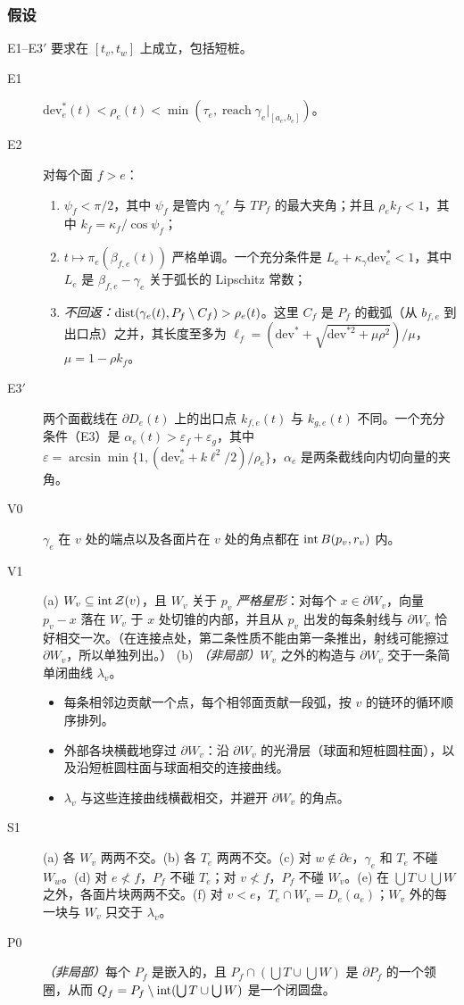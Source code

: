 \subsubsection*{假设}
E1--E3$'$ 要求在 $[t_v,t_w]$ 上成立，包括短桩。
\begin{description}
\item[E1] $\mathrm{dev}^*_e(t)<\rho_e(t)<\min(\tau_e,\operatorname{reach}\gamma_e|_{[a_e,b_e]})$。
\item[E2] 对每个面 $f>e$：
  \begin{enumerate}
  \item $\psi_f<\pi/2$，其中 $\psi_f$ 是管内 $\gamma_e'$ 与 $T P_f$ 的最大夹角；并且 $\rho_e k_f<1$，其中 $k_f=\kappa_f/\cos\psi_f$；
  \item $t\mapsto\pi_e(\beta_{f,e}(t))$ 严格单调。一个充分条件是 $L_e+\kappa_\gamma\mathrm{dev}^*_e<1$，其中 $L_e$ 是 $\beta_{f,e}-\gamma_e$ 关于弧长的 Lipschitz 常数；
  \item \emph{不回返：}$\operatorname{dist}(\gamma_e(t),P_f\setminus C_f)>\rho_e(t)$。这里 $C_f$ 是 $P_f$ 的截弧（从 $b_{f,e}$ 到出口点）之并，其长度至多为 $\ell_f=(\mathrm{dev}^*+\sqrt{\mathrm{dev}^{*2}+\mu\rho^2})/\mu$，$\mu=1-\rho k_f$。
  \end{enumerate}
\item[E3$'$] 两个面截线在 $\partial D_e(t)$ 上的出口点 $k_{f,e}(t)$ 与 $k_{g,e}(t)$ 不同。一个充分条件（E3）是 $\alpha_e(t)>\varepsilon_f+\varepsilon_g$，其中 $\varepsilon=\arcsin\min\{1,(\mathrm{dev}^*_e+k\ell^2/2)/\rho_e\}$，$\alpha_e$ 是两条截线向内切向量的夹角。
\item[V0] $\gamma_e$ 在 $v$ 处的端点以及各面片在 $v$ 处的角点都在 $\operatorname{int} B(p_v,r_v)$ 内。
\item[V1] (a) $W_v\subseteq\operatorname{int}\mathcal{Z}(v)$，且 $W_v$ 关于 $p_v$ \emph{严格星形}：对每个 $x\in\partial W_v$，向量 $p_v-x$ 落在 $W_v$ 于 $x$ 处切锥的内部，并且从 $p_v$ 出发的每条射线与 $\partial W_v$ 恰好相交一次。（在连接点处，第二条性质不能由第一条推出，射线可能擦过 $\partial W_v$，所以单独列出。）
(b) \emph{（非局部）}$W_v$ 之外的构造与 $\partial W_v$ 交于一条简单闭曲线 $\lambda_v$。
\begin{itemize}
\item 每条相邻边贡献一个点，每个相邻面贡献一段弧，按 $v$ 的链环的循环顺序排列。
\item 外部各块横截地穿过 $\partial W_v$：沿 $\partial W_v$ 的光滑层（球面和短桩圆柱面），以及沿短桩圆柱面与球面相交的连接曲线。
\item $\lambda_v$ 与这些连接曲线横截相交，并避开 $\partial W_v$ 的角点。
\end{itemize}
\item[S1] (a) 各 $W_v$ 两两不交。(b) 各 $T_e$ 两两不交。(c) 对 $w\notin\partial e$，$\gamma_e$ 和 $T_e$ 不碰 $W_w$。(d) 对 $e\not<f$，$P_f$ 不碰 $T_e$；对 $v\not<f$，$P_f$ 不碰 $W_v$。(e) 在 $\bigcup T\cup\bigcup W$ 之外，各面片块两两不交。(f) 对 $v<e$，$T_e\cap W_v=D_e(a_e)$；$W_v$ 外的每一块与 $W_v$ 只交于 $\lambda_v$。
\item[P0] \emph{（非局部）}每个 $P_f$ 是嵌入的，且 $P_f\cap(\bigcup T\cup\bigcup W)$ 是 $\partial P_f$ 的一个领圈，从而 $Q_f=P_f\setminus\operatorname{int}(\bigcup T\cup\bigcup W)$ 是一个闭圆盘。
\end{description}
